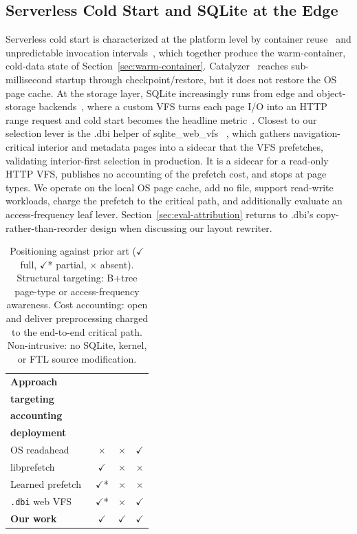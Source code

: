 \documentclass[sigconf, nonacm]{acmart}
\begin{document}
\subsection{Serverless Cold Start and SQLite at the Edge}\label{sec:serverless-coldstart}

Serverless cold start is characterized at the platform level by container reuse~\cite{Wang2018} and unpredictable invocation intervals~\cite{Shahrad2020}, which together produce the warm-container, cold-data state of Section~\ref{sec:warm-container}. Catalyzer~\cite{Du2020} reaches sub-millisecond startup through checkpoint/restore, but it does not restore the OS page cache. At the storage layer, SQLite increasingly runs from edge and object-storage backends~\cite{CloudflareD1,SqliteWebVfs,Litestream,SqlJsHttpvfs,Turbolite}, where a custom VFS turns each page I/O into an HTTP range request and cold start becomes the headline metric~\cite{Turbolite}. Closest to our selection lever is the .dbi helper of sqlite\_web\_vfs ~\cite{SqliteWebVfs}, which gathers navigation-critical interior and metadata pages into a sidecar that the VFS prefetches, validating interior-first selection in production. It is a sidecar for a read-only HTTP VFS, publishes no accounting of the prefetch cost, and stops at page types. We operate on the local OS page cache, add no file, support read-write workloads, charge the prefetch to the critical path, and additionally evaluate an access-frequency leaf lever. Section~\ref{sec:eval-attribution} returns to .dbi's copy-rather-than-reorder design when discussing our layout rewriter.

\begin{table}[htbp]
\centering
\small
\setlength{\tabcolsep}{5pt}
\caption{
Positioning against prior art ($\checkmark$ full, $\checkmark$* partial, $\times$ absent). Structural targeting: B+tree page-type or access-frequency awareness. Cost accounting: open and deliver preprocessing charged to the end-to-end critical path. Non-intrusive: no SQLite, kernel, or FTL source modification.}
\begin{tabular}{@{}l ccc@{}}
\toprule
\textbf{Approach} & \shortstack{\textbf{Structural}\\\textbf{targeting}} & \shortstack{\textbf{Cost}\\\textbf{accounting}} & \shortstack{\textbf{Non-intrusive}\\\textbf{deployment}} \\
\midrule
OS readahead~\cite{Smith1978,Iyer2001} & $\times$ & $\times$ & $\checkmark$ \\
libprefetch~\cite{VanDeBogart2009} & $\checkmark$ & $\times$ & $\times$ \\
Learned prefetch~\cite{Chen2021,Yi2026} & $\checkmark$* & $\times$ & $\times$ \\
\texttt{.dbi} web VFS~\cite{SqliteWebVfs} & $\checkmark$* & $\times$ & $\checkmark$ \\
\midrule
\textbf{Our work} & $\checkmark$ & $\checkmark$ & $\checkmark$ \\
\bottomrule
\end{tabular}
\label{tab:capability}
\end{table}
\end{document}
